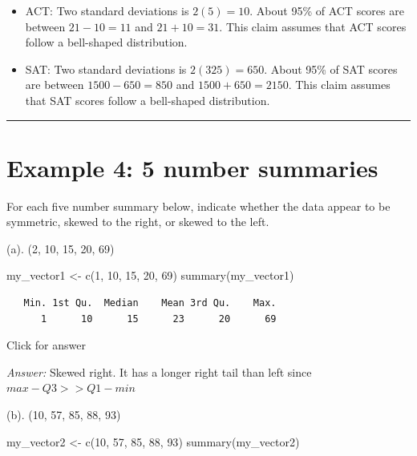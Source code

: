 \documentclass[
]{book}
\newenvironment{Shaded}{\begin{snugshade}}{\end{snugshade}}
\newcommand{\DecValTok}[1]{\textcolor[rgb]{0.00,0.00,0.81}{#1}}
\newcommand{\FunctionTok}[1]{\textcolor[rgb]{0.00,0.00,0.00}{#1}}
\newcommand{\NormalTok}[1]{#1}
\newcommand{\OtherTok}[1]{\textcolor[rgb]{0.56,0.35,0.01}{#1}}
\begin{document}
\begin{itemize}
\item
  ACT: Two standard deviations is \(2(5) = 10.\) About 95\% of ACT scores are between \(21 - 10 = 11\) and \(21 + 10 = 31.\) This claim assumes that ACT scores follow a bell-shaped distribution.
\item
  SAT: Two standard deviations is \(2(325) = 650.\) About 95\% of SAT scores are between \(1500 - 650 = 850\) and \(1500 + 650 = 2150\). This claim assumes that SAT scores follow a bell-shaped distribution.
\end{itemize}

\begin{center}\rule{0.5\linewidth}{0.5pt}\end{center}

\hypertarget{example-4-5-number-summaries}{%
\section{Example 4: 5 number summaries}\label{example-4-5-number-summaries}}

For each five number summary below, indicate whether the data appear to be symmetric, skewed to the right, or skewed to the left.

(a). (2, 10, 15, 20, 69)

\begin{Shaded}
\begin{Highlighting}[]
\NormalTok{my\_vector1 }\OtherTok{\textless{}{-}} \FunctionTok{c}\NormalTok{(}\DecValTok{1}\NormalTok{, }\DecValTok{10}\NormalTok{, }\DecValTok{15}\NormalTok{, }\DecValTok{20}\NormalTok{, }\DecValTok{69}\NormalTok{)}
\FunctionTok{summary}\NormalTok{(my\_vector1)}
\end{Highlighting}
\end{Shaded}

\begin{verbatim}
   Min. 1st Qu.  Median    Mean 3rd Qu.    Max. 
      1      10      15      23      20      69 
\end{verbatim}

Click for answer

\emph{Answer:} Skewed right. It has a longer right tail than left since \(max - Q3 >> Q1 - min\)

(b). (10, 57, 85, 88, 93)

\begin{Shaded}
\begin{Highlighting}[]
\NormalTok{my\_vector2 }\OtherTok{\textless{}{-}} \FunctionTok{c}\NormalTok{(}\DecValTok{10}\NormalTok{, }\DecValTok{57}\NormalTok{, }\DecValTok{85}\NormalTok{, }\DecValTok{88}\NormalTok{, }\DecValTok{93}\NormalTok{)}
\FunctionTok{summary}\NormalTok{(my\_vector2)}
\end{Highlighting}
\end{Shaded}
\end{document}
